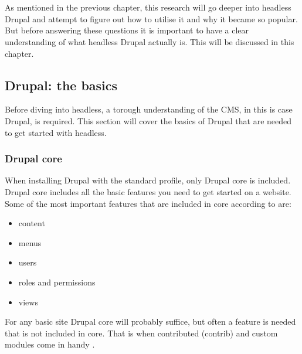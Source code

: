 \chapter{}
\label{ch:stand-van-zaken}



As mentioned in the previous chapter, this research will go deeper into headless Drupal and attempt to figure out how to utilise it and why it became so popular. But before answering these questions it is important to have a clear understanding of what headless Drupal actually is. This will be discussed in this chapter. 

\section{Drupal: the basics}

Before diving into headless, a torough understanding of the CMS, in this is case Drupal, is required. This section will cover the basics of Drupal that are needed to get started with headless.


\subsection{Drupal core}

When installing Drupal with the standard profile, only \gls{Drupal core} is included. Drupal core includes all the basic features you need to get started on a website. Some of the most important features that are included in core according to \textcite{Tomlinson2015} are: 

\begin{itemize}
	\item  content
	\item  menus
	\item  users
	\item  roles and permissions
	\item  views
\end{itemize}

For any basic site Drupal core will probably suffice, but often a feature is needed that is not included in core. That is when contributed (contrib) and custom modules come in handy \autocite{Tomlinson2015}.

